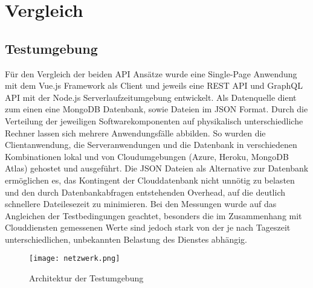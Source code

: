 \chapter{Vergleich}
\section{Testumgebung}
Für den Vergleich der beiden API Ansätze wurde eine Single-Page Anwendung mit dem Vue.js Framework als Client und jeweils eine REST API und GraphQL API mit der Node.js Serverlaufzeitumgebung entwickelt.
Als Datenquelle dient zum einen eine MongoDB Datenbank, sowie Dateien im JSON Format.
Durch die Verteilung der jeweiligen Softwarekomponenten auf physikalisch unterschiedliche Rechner lassen sich mehrere Anwendungsfälle abbilden.
So wurden die Clientanwendung, die Serveranwendungen und die Datenbank in verschiedenen Kombinationen lokal und von Cloudumgebungen (Azure, Heroku, MongoDB Atlas) gehostet und ausgeführt.
Die JSON Dateien als Alternative zur Datenbank ermöglichen es, das Kontingent der Clouddatenbank nicht unnötig zu belasten und den durch Datenbankabfragen entstehenden Overhead, auf die deutlich schnellere Dateilesezeit zu minimieren.
Bei den Messungen wurde auf das Angleichen der Testbedingungen geachtet, besonders die im Zusammenhang mit Clouddiensten gemessenen Werte sind jedoch stark von der je nach Tageszeit unterschiedlichen, unbekannten Belastung des Dienstes abhängig.
\begin{figure}[h]
  \centering
  \texttt{[image: netzwerk.png]}
  \caption{Architektur der Testumgebung}\label{img:netzwerk}
\end{figure}
